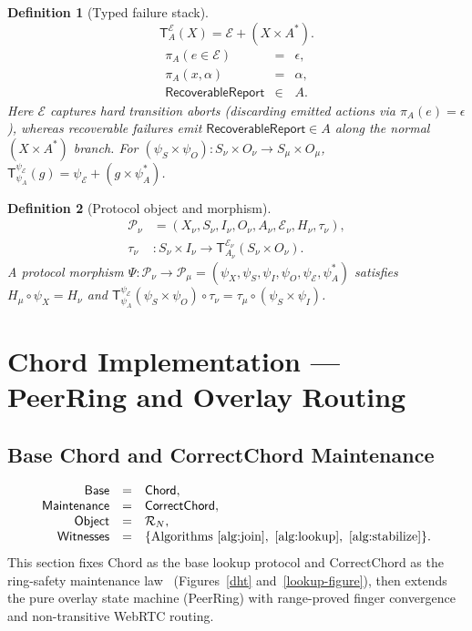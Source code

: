 \documentclass[journal]{IEEEtran}
\newtheorem{definition}{Definition}
\DeclareRobustCommand{\code}[1]{{\ttfamily\renewcommand{\_}{\textunderscore\allowbreak}#1}}
\begin{document}
\begin{definition}[Typed failure stack]
\[
  \mathsf{T}^{\mathcal{E}}_A(X)=\mathcal{E}+(X\times A^*).
\]
\[
\begin{array}{rcl}
\pi_A(e\in\mathcal{E})&=&\epsilon,\\
\pi_A(x,\alpha)&=&\alpha,\\
\mathsf{RecoverableReport}&\in&A.
\end{array}
\]
Here $\mathcal{E}$ captures hard transition aborts (discarding emitted actions via $\pi_A(e)=\epsilon$), whereas recoverable failures emit $\mathsf{RecoverableReport}\in A$ along the normal $(X\times A^*)$ branch. For $(\psi_S\times\psi_O):S_\nu\times O_\nu\to S_\mu\times O_\mu$, $\mathsf{T}^{\psi_{\mathcal{E}}}_{\psi_A}(g)=\psi_{\mathcal{E}}+(g\times\psi_A^*)$.
\end{definition}

\begin{definition}[Protocol object and morphism]
\[
\begin{aligned}
  \mathcal{P}_\nu &= (X_\nu,S_\nu,I_\nu,O_\nu,A_\nu,\mathcal{E}_\nu,H_\nu,\tau_\nu),\\
  \tau_\nu &: S_\nu\times I_\nu \to \mathsf{T}^{\mathcal{E}_\nu}_{A_\nu}(S_\nu\times O_\nu).
\end{aligned}
\]
A protocol morphism $\Psi:\mathcal{P}_\nu\to\mathcal{P}_\mu=(\psi_X,\psi_S,\psi_I,\psi_O,\psi_{\mathcal{E}},\psi_A^*)$ satisfies $H_\mu\circ\psi_X=H_\nu$ and $\mathsf{T}_{\psi_A}^{\psi_{\mathcal{E}}}(\psi_S\times\psi_O)\circ\tau_\nu=\tau_\mu\circ(\psi_S\times\psi_I)$.
\end{definition}

\section{Chord Implementation --- PeerRing and Overlay Routing}\label{sec:chord}

\subsection{Base Chord and CorrectChord Maintenance}

\[
\begin{array}{rcl}
\mathsf{Base}&=&\mathsf{Chord},\\
\mathsf{Maintenance}&=&\mathsf{CorrectChord},\\
\mathsf{Object}&=&\mathcal{R}_N,\\
\mathsf{Witnesses}&=&
  \{\text{Algorithms }\ref{alg:join},\ \ref{alg:lookup},\ \ref{alg:stabilize}\}.
\end{array}
\]
This section fixes Chord as the base lookup protocol and CorrectChord as the
ring-safety maintenance law~\cite{Chord,ZaveChordCorrect} (Figures~\ref{dht} and~\ref{lookup-figure}), then extends the
pure overlay state machine (\code{PeerRing}) with range-proved finger convergence and
non-transitive WebRTC routing.
\end{document}
